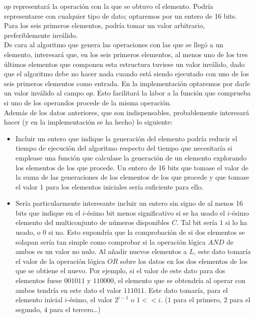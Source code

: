 $op$ representará la operación con la que se obtuvo el elemento.
Podría representarse con cualquier tipo de dato; optaremos por un entero
de 16 bits. Para los seis primeros elementos, podría tomar un valor
arbitrario, preferiblemente inválido.\\

De cara al algoritmo que genera las operaciones con las que se llegó a un
elemento, interesará que, en los seis primeros elementos, al menos uno de los
tres últimos elementos que componen esta estructura tuviese un valor inválido,
dado que el algoritmo debe no hacer nada cuando está siendo ejecutado con uno
de los seis primeros elementos como entrada. En la implementación optaremos
por darle un valor inválido al campo $op$. Esto facilitará la labor a la función
que comprueba si uno de los operandos procede de la misma operación. \\

Además de los datos anteriores, que son indispensables, probablemente
interesará hacer (y en la implementación se ha hecho) lo siguiente:

\begin{itemize}
	\item Incluir un entero que indique la generación del elemento podría reducir
	el tiempo de ejecución del algoritmo respecto del tiempo que necesitaría si
	emplease una función que calculase la generación de un elemento explorando los
	 elementos de los que procede. Un entero de 16 bits que tomase el valor de la
	  suma de las generaciones de los elementos de los que procede y que tomase el
		 valor 1 para los elementos iniciales sería suficiente para ello.
	\item Sería particularmente interesante incluir un entero sin signo de al
	menos 16 bits que indique en el $i$-ésimo bit menos significativo si se ha
	usado el $i$-ésimo elemento del multiconjunto de números disponibles $C$. Tal
	bit sería $1$ si lo ha usado, o $0$ si no. Esto supondría que la comprobación
	de si dos elementos se solapan sería tan simple como comprobar si la operación
	lógica $AND$ de ambos es un valor no nulo. Al añadir nuevos elementos a $L$,
	este dato tomaría el valor de la operación lógica $OR$ sobre los datos en los
	dos elementos de los que se obtiene el nuevo. Por ejemplo, si el valor de
	este dato para dos elementos fuese $001011$ y $110000$, el elemento que se
	obtendría al operar con ambos tendría en este dato el valor $111011$. Este
	dato tomaría, para el elemento inicial $i$-ésimo, el valor $2^{i-1}$ o
	$1 << i$. ($1$ para el primero, $2$ para el segundo, $4$ para el tercero\ldots)
\end{itemize}

